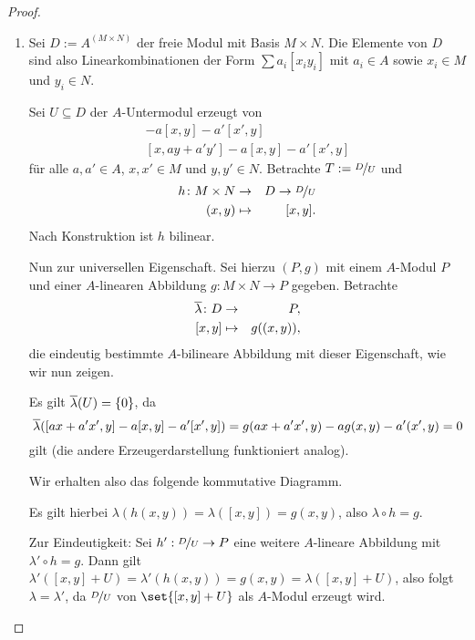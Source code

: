 \documentclass[12pt,a4paper]{scrartcl}
\theoremstyle{cplain}
\theoremstyle{cdef}
\begin{document}
\begin{proof}
	\leavevmode
	\begin{enumerate}[label=\ref{prop:tensorprodukt:\roman*}]
		\item
		Sei $D := A^{(M \times N)}$ der freie Modul mit Basis $M \times N$. Die Elemente von $D$ sind also Linearkombinationen der Form $\sum a_i [x_iy_i]$ mit $a_i \in A$ sowie $x_i \in M$ und $y_i \in N$.
		
		Sei $U \subseteq D$ der $A$-Untermodul erzeugt von
		\begin{align*}
			[ax+a'x',y] - a[x,y]-a'[x',y] \\
			[x,ay+a'y'] - a[x,y]-a'[x',y]
		\end{align*}
		für alle $a,a' \in A$, $x,x' \in M$ und $y,y' \in N$. Betrachte $T := \nicefrac{D}{U}$ und
		\begin{eqnarray*}
			h\colon M \times N &\to& D \to \nicefrac{D}{U} \\
			(x,y) &\mapsto& [x,y].
		\end{eqnarray*}
		Nach Konstruktion ist $h$ bilinear.
		
		Nun zur universellen Eigenschaft. Sei hierzu $(P,g)$ mit einem $A$-Modul $P$ und einer $A$-linearen Abbildung $g: M \times N \to P$ gegeben. Betrachte
		\begin{eqnarray*}
			\overline \lambda \colon D &\to& P, \\
			\left[x,y\right] &\mapsto& g((x,y)),
		\end{eqnarray*}
		die eindeutig bestimmte $A$-bilineare Abbildung mit dieser Eigenschaft, wie wir nun zeigen.

		Es gilt $\overline \lambda (U) = \{0\}$, da \[ \overline\lambda ([ax+a'x',y]-a[x,y]-a'[x',y]) = g(ax+a'x',y)-ag(x,y)-a'(x',y) = 0 \]
		gilt (die andere Erzeugerdarstellung funktioniert analog).

		Wir erhalten also das folgende kommutative Diagramm.
		\begin{center}
		\end{center}
		Es gilt hierbei $\lambda(h(x,y)) = \lambda([x,y]) = g(x,y)$, also $\lambda \circ h = g$.

		Zur Eindeutigkeit: Sei $h': \nicefrac{D}{U} \to P$ eine weitere $A$-lineare Abbildung mit $\lambda' \circ h = g$. Dann gilt $\lambda'([x,y]+U) = \lambda'(h(x,y)) = g(x,y) = \lambda([x,y]+U)$, also folgt $\lambda = \lambda'$, da $\nicefrac{D}{U}$ von $\set{[x,y]+U}$ als $A$-Modul erzeugt wird.


\end{enumerate}
\end{proof}
\end{document}
